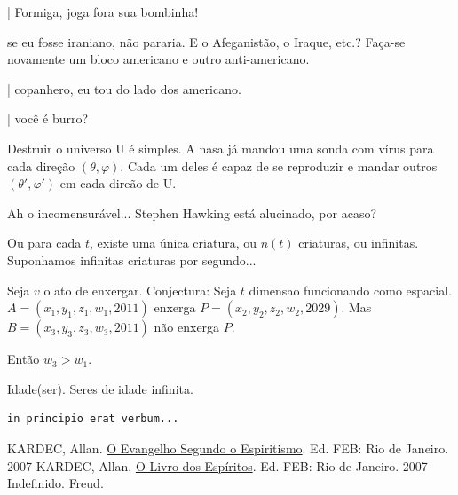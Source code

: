 \documentclass[12pt,a4paper]{article}
\begin{document}
| Formiga, joga fora sua bombinha!

se eu fosse iraniano, n\~ao pararia. E o Afeganist\~ao, o Iraque, etc.?
Fa\c{c}a-se novamente um bloco americano e outro anti-americano.

| copanhero, eu tou do lado dos americano.

| voc\^e \'e burro?

			\begin{flushright}
			\end{flushright}

Destruir o universo U \'e simples. A nasa j\'a mandou uma
sonda com v\'irus para cada dire\c{c}\~ao $(\theta, \varphi)$. Cada um deles \'e capaz de
se reproduzir e mandar outros $(\theta', \varphi')$ em cada dire\~ao de
U.

			\begin{flushright}
			\end{flushright}

Ah o incomensur\'avel... Stephen Hawking est\'a alucinado, por acaso?

			\begin{flushright}
			\end{flushright}

Ou para cada $t$, existe uma \'unica criatura, ou $n(t)$ criaturas, ou infinitas. Suponhamos infinitas criaturas por segundo...

			\begin{flushright}
			\end{flushright}

Seja $v$ o ato de enxergar. Conjectura: Seja $t$ dimensao funcionando como espacial. $A = (x_1, y_1, z_1, w_1, 2011)$ enxerga $P = (x_2, y_2, z_2, w_2, 2029)$. Mas $B = (x_3, y_3, z_3, w_3, 2011)$ n\~ao enxerga $P$.

Ent\~ao $w_3 > w_1$.

			\begin{flushright}
			\end{flushright}

Idade(ser). Seres de idade infinita.

			\begin{flushright}
			\end{flushright}

			\begin{verbatim}
in principio erat verbum...
			\end{verbatim}

	\begin{thebibliography}{15}

		 KARDEC, Allan. \href{https://github.com/boralaemcasa/propagation/tree/master/webs%20dot%20com/citacoes/Allan Kardec - O Evangelho Segundo o Espiritismo.pdf}{O Evangelho Segundo o Espiritismo}. Ed. FEB: Rio de Janeiro. 2007
		 KARDEC, Allan. \href{https://github.com/boralaemcasa/propagation/tree/master/webs%20dot%20com/citacoes/Allan Kardec - O Livro dos Espiritos.pdf}{O Livro dos Esp\'iritos}. Ed. FEB: Rio de Janeiro. 2007
		 Indefinido.
		 Freud.

	\end{thebibliography}

	\addtocontents{}{\noindent\protect\rule{\textwidth}{.2pt}\par}
\end{document}
